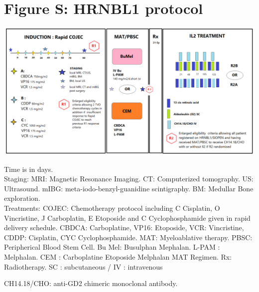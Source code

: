 \documentclass[11pt]{article}
\newcounter{fignb}  %
\begin{document}
\section{Figure S: HRNBL1 protocol}
\spaceV
\begin{center}
\includegraphics[width=1\textwidth]{figure_S1}
\end{center}

Time is in days.\\
Staging: MRI: Magnetic Resonance Imaging. CT: Computerized tomography. US: Ultrasound. mIBG: meta-iodo-benzyl-guanidine scintigraphy. BM: Medullar Bone exploration.\\
Treatments: COJEC: Chemotherapy protocol including C Cisplatin, O Vincristine, J Carboplatin, E Etoposide and C Cyclophosphamide given in rapid delivery schedule. CBDCA: Carboplatine, VP16: Etoposide, VCR: Vincristine, CDDP: Cisplatin, CYC Cyclophosphamide. MAT: Myeloablative therapy. PBSC: Peripherical Blood Stem Cell. Bu Mel: Busulphan Mephalan. L-PAM : Melphalan. CEM : Carboplatine Etoposide Melphalan MAT Regimen. Rx: Radiotherapy. SC : subcutaneous / IV : intravenous

CH14.18/CHO: anti-GD2 chimeric monoclonal antibody.
\newpage
{}
\end{document}
